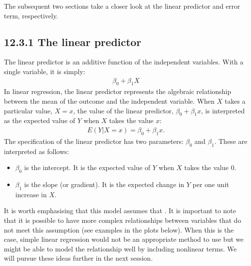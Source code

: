 \documentclass[letterpaper,10pt,english]{jupyterBook}
\begin{document}
\sphinxAtStartPar
The subsequent two sections take a closer look at the linear predictor and error term, respectively.


\subsection{12.3.1 The linear predictor}
\label{\detokenize{12.d. Linear Regression I:the-linear-predictor}}
\sphinxAtStartPar
The linear predictor is an additive function of the independent variables. With a single variable, it is simply:
\begin{equation*}
\begin{split}
\beta_0 + \beta_1 X
\end{split}
\end{equation*}
\sphinxAtStartPar
In linear regression, the linear predictor represents the algebraic relationship between the mean of the outcome and the independent variable. When \(X\) takes a particular value, \(X=x\), the value of the linear predictor, \(\beta_0+\beta_1x\), is interpreted as the expected value of \(Y\) when \(X\) takes the value \(x\):
\begin{equation*}
\begin{split}
E(Y|X=x) = \beta_0 + \beta_1 x.
\end{split}
\end{equation*}
\sphinxAtStartPar
The specification of the linear predictor has two parameters: \(\beta_0\) and \(\beta_1\). These are interpreted as follows:
\begin{itemize}
\item {} 
\sphinxAtStartPar
\(\beta_0\) is the intercept. It is the expected value of \(Y\) when \(X\) takes the value 0.

\item {} 
\sphinxAtStartPar
\(\beta_1\) is the slope (or gradient). It is the expected change in \(Y\) per one unit increase in \(X\).

\end{itemize}

\sphinxAtStartPar
It is worth emphasising that this model assumes that . It is important to note that it is possible to have more complex relationships between variables that do not meet this assumption (see examples in the plots below). When this is the case, simple linear regression would not be an appropriate method to use but we might be able to model the relationship well by including non\sphinxhyphen{}linear terms. We will pursue these ideas further in the next session.
\end{document}
